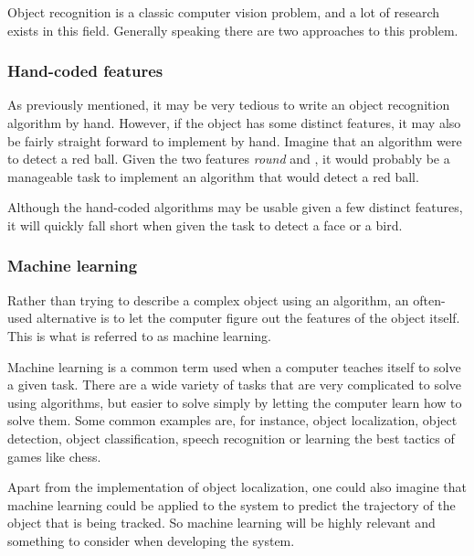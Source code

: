 Object recognition is a classic computer vision problem, and a lot of research exists in this field.
Generally speaking there are two approaches to this problem.

\subsubsection{Hand-coded features}
As previously mentioned, it may be very tedious to write an object recognition algorithm by hand.
However, if the object has some distinct features, it may also be fairly straight forward to implement by hand.
Imagine that an algorithm were to detect a red ball. 
Given the two features \textit{round} and , it would probably be a manageable task to implement an algorithm that would detect a red ball.

Although the hand-coded algorithms may be usable given a few distinct features, it will quickly fall short when given the task to detect a face or a bird.

\subsubsection{Machine learning}\label{sec:obj_tracking:sub:ML}
Rather than trying to describe a complex object using an algorithm, an often-used alternative is to let the computer figure out the features of the object itself.
This is what is referred to as machine learning.

Machine learning is a common term used when a computer teaches itself to solve a given task\cite{ArtificialIntelligencealanpoole}.
There are a wide variety of tasks that are very complicated to solve using algorithms, but easier to solve simply by letting the computer learn how to solve them. 
Some common examples are, for instance, object localization, object detection, object classification, speech recognition or learning the best tactics of games like chess.

Apart from the implementation of object localization, one could also imagine that machine learning could be applied to the system to predict the trajectory of the object that is being tracked.
So machine learning will be highly relevant and something to consider when developing the system.
